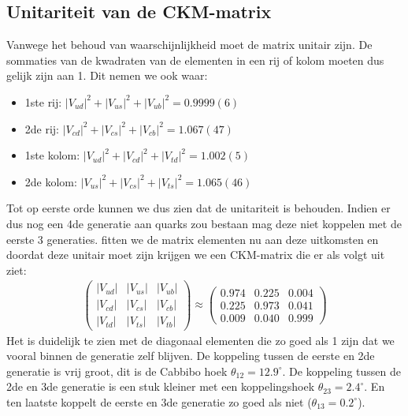 \documentclass[../main.tex]{subfiles}
\begin{document}
\subsection{Unitariteit van de CKM-matrix}%
\label{sub:unitariteit_van_de_ckm_matrix}

Vanwege het behoud van waarschijnlijkheid moet de matrix unitair zijn. De sommaties van de kwadraten van de elementen in een rij of kolom moeten dus gelijk zijn aan 1. Dit nemen we ook waar:
\begin{itemize}
    \item 1ste rij: $\left|V_{u d}\right|^{2}+\left|V_{u s}\right|^{2}+\left|V_{u b}\right|^{2}=0.9999(6)$
    \item 2de rij: $\left|V_{c d}\right|^{2}+\left|V_{c s}\right|^{2}+\left|V_{c b}\right|^{2}=1.067(47)$
    \item 1ste kolom: $\left|V_{u d}\right|^{2}+\left|V_{c d}\right|^{2}+\left|V_{t d}\right|^{2}=1.002(5)$
    \item 2de kolom: $\left|V_{u s}\right|^{2}+\left|V_{c s}\right|^{2}+\left|V_{t s}\right|^{2}=1.065(46)$
\end{itemize}
Tot op eerste orde kunnen we dus zien dat de unitariteit is behouden. Indien er dus nog een 4de generatie aan quarks zou bestaan mag deze niet koppelen met de eerste 3 generaties. fitten we de matrix elementen nu aan deze uitkomsten en doordat deze unitair moet zijn krijgen we een CKM-matrix die er als volgt uit ziet:
\begin{equation}
    \begin{aligned}
        \label{eq:ckm_huidig}
        \left(\begin{array}{ccc}
                \left|V_{u d}\right| & \left|V_{u s}\right| & \left|V_{u b}\right| \\
                \left|V_{c d}\right| & \left|V_{c s}\right| & \left|V_{c b}\right| \\
                \left|V_{t d}\right| & \left|V_{t s}\right| & \left|V_{t b}\right|
                \end{array}\right) \approx\left(\begin{array}{ccc}
                0.974 & 0.225 & 0.004 \\
                0.225 & 0.973 & 0.041 \\
                0.009 & 0.040 & 0.999
        \end{array}\right)
    \end{aligned}
\end{equation}
Het is duidelijk te zien met de diagonaal elementen die zo goed als 1 zijn dat we vooral binnen de generatie zelf blijven. De koppeling tussen de eerste en 2de generatie is vrij groot, dit is de Cabbibo hoek $\theta_{12} = 12.9^\circ$. De koppeling tussen de 2de en 3de generatie is een stuk kleiner met een koppelingshoek $\theta_{23} = 2.4^\circ$. En ten laatste koppelt de eerste en 3de generatie zo goed als niet ($\theta_{13} = 0.2^\circ$).
\end{document}
